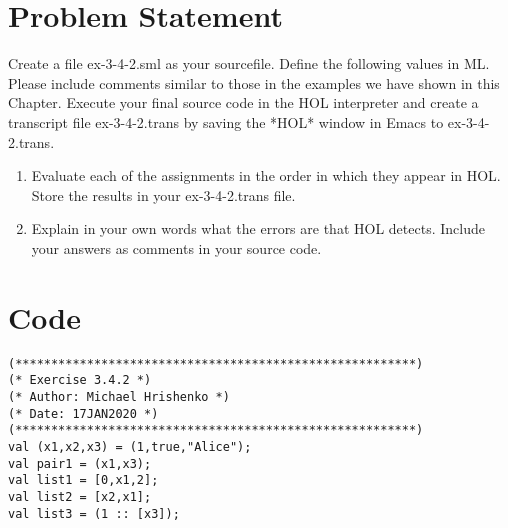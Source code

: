 \documentclass[oneside]{book}
\begin{document}
\section{Problem Statement}
Create a file ex-3-4-2.sml as your sourcefile. Define the following values in ML. Please
include comments similar to those in the examples we have shown in this Chapter. Execute your final source
code in the HOL interpreter and create a transcript file ex-3-4-2.trans by saving the *HOL* window in
Emacs to ex-3-4-2.trans.
\begin{enumerate}
    \item Evaluate each of the assignments in the order in which they appear in HOL. Store the results in your ex-3-4-2.trans file.
    \item Explain in your own words what the errors are that HOL detects. Include your answers as comments in your source code.
\end{enumerate}
\section{Code}
    \begin{lstlisting}
(********************************************************)
(* Exercise 3.4.2 *)
(* Author: Michael Hrishenko *)
(* Date: 17JAN2020 *)
(********************************************************)
val (x1,x2,x3) = (1,true,"Alice");
val pair1 = (x1,x3);
val list1 = [0,x1,2];
val list2 = [x2,x1];
val list3 = (1 :: [x3]);
    \end{lstlisting}
\end{document}
